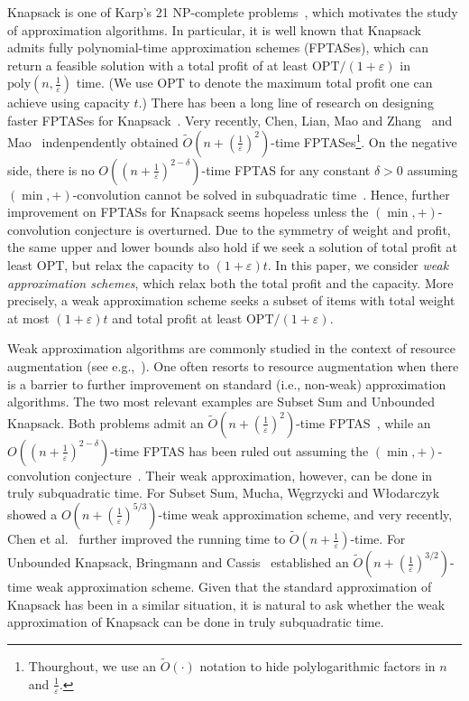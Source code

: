 \documentclass[a4paper,UKenglish,cleveref, autoref, thm-restate, pdfa]{lipics-v2021}
\newcommand{\eps}{\varepsilon}
\begin{document}
Knapsack is one of Karp's 21 NP-complete problems~\cite{Kar72}, which motivates the study of approximation algorithms. In particular, it is well known that Knapsack admits fully polynomial-time approximation schemes (FPTASes), which can return a feasible solution with a total profit of at least $\mathrm{OPT}/(1 + \eps)$ in $\mathrm{poly}(n, \frac{1}{\eps})$ time. (We use $\mathrm{OPT}$ to denote the maximum total profit one can achieve using capacity $t$.) There has been a long line of research on designing faster FPTASes for Knapsack~\cite{IK75,Law79,KP04,Rhe15,Chan18,Jin19,DJM23,CLMZ24bSTOCKnapsack,
Mao24}. Very recently, Chen, Lian, Mao and Zhang~\cite{CLMZ24bSTOCKnapsack} and Mao~\cite{Mao24} indenpendently obtained $\tilde{O}(n + (\frac{1}{\eps})^2)$-time FPTASes\footnote{Thourghout, we use an $\tilde{O}(\cdot)$ notation to hide polylogarithmic factors in $n$ and $\frac{1}{\eps}$.}.
On the negative side, there is no $O((n + \frac{1}{\eps})^{2-\delta})$-time FPTAS for any constant $\delta > 0$ assuming $(\min, +)$-convolution cannot be solved in subquadratic time~\cite{CMWW19, KPS17}. Hence, further improvement on FPTASs for Knapsack seems hopeless unless the $(\min, +)$-convolution conjecture is overturned. Due to the symmetry of weight and profit, the same upper and lower bounds also hold if we seek a solution of total profit at least $\mathrm{OPT}$, but relax the capacity to $(1 + \eps)t$.
In this paper, we consider {\it weak approximation schemes}, which relax both the total profit and the capacity. More precisely, a weak approximation scheme seeks a subset of items with total weight at most $(1+\eps)t$ and total profit at least $\mathrm{OPT}/(1+ \eps)$.

Weak approximation algorithms are commonly studied in the context of resource augmentation (see e.g.,~\cite{FGJS05, IZ10}). One often resorts to resource augmentation when there is a barrier to further improvement on standard (i.e., non-weak) approximation algorithms. The two most relevant examples are Subset Sum and Unbounded Knapsack. Both problems admit an $\tilde{O}(n + (\frac{1}{\eps})^2)$-time FPTAS~\cite{KMPS03,BN21b,JK18}, while an $O((n+\frac{1}{\eps})^{2-\delta})$-time FPTAS has been ruled out assuming the $(\min,+)$-convolution conjecture~\cite{KPS17,CMWW19,MWW19,BN21b}. Their weak approximation, however, can be done in truly subquadratic time. For Subset Sum, Mucha, W{\k{e}}grzycki and W{\l}odarczyk~\cite{MWW19} showed a $O(n+(\frac{1}{\eps})^{5/3})$-time weak approximation scheme, and very recently, Chen et al.~\cite{CLMZ24cSTOCPartition} further improved the running time to $\tilde{O}(n+\frac{1}{\eps})$-time. 
For Unbounded Knapsack, Bringmann and Cassis~\cite{BC22} established an $\tilde{O}(n+(\frac{1}{\eps})^{3/2})$-time weak approximation scheme. Given that the standard approximation of Knapsack has been in a similar situation, it is natural to ask whether the weak approximation of Knapsack can be done in truly subquadratic time.
\end{document}
